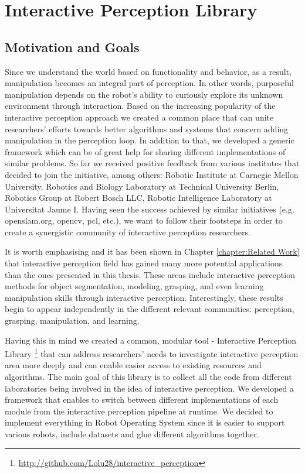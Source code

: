\chapter{Interactive Perception Library}
\label{chapter:Interactive Perception Library}


\section{Motivation and Goals}
Since we understand the world based on functionality and behavior, as a result, manipulation becomes an integral part of perception. In other words, purposeful manipulation depends on the robot's ability to curiously explore its unknown environment through interaction. Based on the increasing popularity of the interactive perception approach we created a common place that can unite researchers' efforts towards better algorithms and systems that concern adding manipulation in the perception loop. In addition to that, we developed a generic framework which can be of great help for sharing different implementations of similar problems. So far we received positive feedback from various institutes that decided to join the initiative, among others: Robotic Institute at Carnegie Mellon University, Robotics and Biology Laboratory at Technical University Berlin, Robotics Group at Robert Bosch LLC, Robotic Intelligence Laboratory at Universitat Jaume I. Having seen the success achieved by similar initiatives (e.g. openslam.org, opencv, pcl, etc.), we want to follow their footsteps in order to create a synergistic community of interactive perception researchers.

It is worth emphasising and it has been shown in Chapter \ref{chapter:Related Work} that interactive perception field has gained many more potential applications than the ones presented in this thesis. These areas include interactive perception methods for object segmentation, modeling, grasping, and even learning manipulation skills through interactive perception. Interestingly, these results begin to appear independently in the different relevant communities: perception, grasping, manipulation, and learning.

Having this in mind we created a common, modular tool - Interactive Perception Library \footnote{\url{http://github.com/Lolu28/interactive_perception}} that can address researchers' needs to investigate interactive perception area more deeply and can enable easier access to existing resources and algorithms. The main goal of this library is to collect all the code from different laboratories being involved in the idea of interactive perception. We developed a framework that enables to switch between different implementations of each module from the interactive perception pipeline at runtime. We decided to implement everything in Robot Operating System since it is easier to support various robots, include datasets and glue different algorithms together. 


